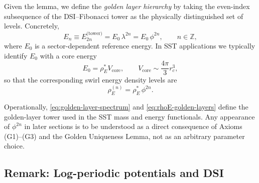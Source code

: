 \documentclass[10pt,reprint,aps,onecolumn,nofootinbib]{revtex4-2}
\newcommand{\rhoE}{\rho_{\!E}}                           %
\newcommand{\rc}{r_c}                                    %
\begin{document}
        Given the lemma, we define the \emph{golden layer hierarchy} by taking
        the even-index subsequence of the DSI--Fibonacci tower as the physically
        distinguished set of levels. Concretely,
        \begin{equation}
            E_n \equiv E_{2n}^{\text{(tower)}}
            = E_0\,\lambda^{2n}
            = E_0\,\phi^{2n},
            \qquad
            n\in\mathbb{Z},
            \label{eq:golden-layer-spectrum}
        \end{equation}
        where $E_0$ is a sector-dependent reference energy. In SST applications
        we typically identify $E_0$ with a core energy
        \begin{equation}
            E_0 = \rhoE^{*} V_{\text{core}},
            \qquad
            V_{\text{core}} \sim \frac{4\pi}{3}\rc^{3},
        \end{equation}
        so that the corresponding swirl energy density levels are
        \begin{equation}
            \rhoE^{(n)} = \rhoE^{*}\,\phi^{2n}.
            \label{eq:rhoE-golden-layers}
        \end{equation}

        Operationally, \eqref{eq:golden-layer-spectrum} and
        \eqref{eq:rhoE-golden-layers} define the golden-layer tower used in the
        SST mass and energy functionals. Any appearance of $\phi^{2n}$ in later
        sections is to be understood as a direct consequence of Axioms
        (G1)--(G3) and the Golden Uniqueness Lemma, not as an arbitrary
        parameter choice.

    \subsection{Remark: Log-periodic potentials and DSI}
\end{document}

